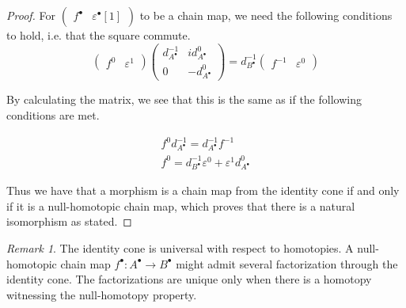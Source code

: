 \documentclass[11pt]{article}
\theoremstyle{definition}
\theoremstyle{remark}
\newtheorem*{remark}{Remark}
\newcommand{\chain}[1]{#1^{\bullet}}
\begin{document}
\begin{proof}
                For $\begin{pmatrix}\chain{f} & \chain{\varepsilon}[1]\end{pmatrix}$ to be a chain map, we need the following conditions to hold, i.e. that the square commute.
                \begin{equation*}
                    \begin{pmatrix}f^0 & \varepsilon^1 \end{pmatrix}\begin{pmatrix}d^{-1}_{\chain{A}} & id^0_{\chain{A}} \\ 0 & -d^0_{\chain{A}}\end{pmatrix}=d^{-1}_{\chain{B}}\begin{pmatrix} f^{-1} & \varepsilon^0 \end{pmatrix}
                \end{equation*}

                By calculating the matrix, we see that this is the same as if the following conditions are met.

                \begin{align*}
                    f^0d^{-1}_{\chain{A}} = d^{-1}_{\chain{A}}f^{-1} \\
                    f^0 = d^{-1}_{\chain{B}}\varepsilon^0 + \varepsilon^1d^0_{\chain{A}}
                \end{align*}

                Thus we have that a morphism is a chain map from the identity cone if and only if it is a null-homotopic chain map, which proves that there is a natural isomorphism as stated.
            \end{proof}

            \begin{remark}
                The identity cone is universal with respect to homotopies. A null-homotopic chain map $\chain{f}:\chain{A}\rightarrow \chain{B}$ might admit several factorization through the identity cone. The factorizations are unique only when there is a homotopy witnessing the null-homotopy property.
                \begin{center}
                \end{center}
            \end{remark}
\end{document}
